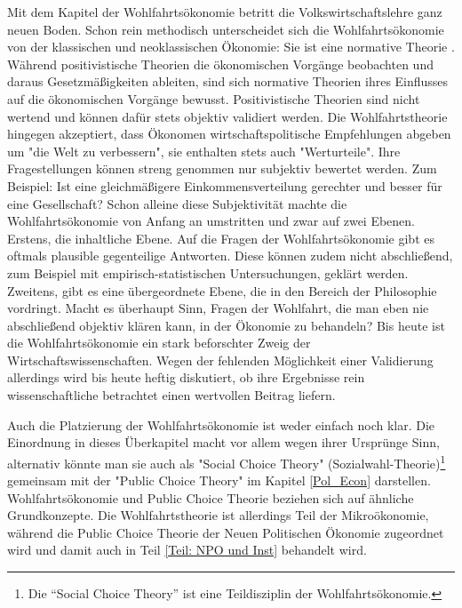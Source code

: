 Mit dem Kapitel der Wohlfahrtsökonomie betritt die Volkswirtschaftslehre ganz neuen Boden. Schon rein methodisch unterscheidet sich die Wohlfahrtsökonomie von der klassischen und neoklassischen Ökonomie: Sie ist eine normative Theorie \parencite[S. 77]{Scitovsky1941}. Während positivistische Theorien die ökonomischen Vorgänge beobachten und daraus Gesetzmäßigkeiten ableiten, sind sich normative Theorien ihres Einflusses auf die ökonomischen Vorgänge bewusst. Positivistische Theorien sind nicht wertend und können dafür stets objektiv validiert werden. Die Wohlfahrtstheorie hingegen akzeptiert, dass Ökonomen wirtschaftspolitische Empfehlungen abgeben um "die Welt zu verbessern", sie enthalten stets auch "Werturteile". Ihre Fragestellungen können streng genommen nur subjektiv bewertet werden. Zum Beispiel: Ist eine gleichmäßigere Einkommensverteilung gerechter und besser für eine Gesellschaft?  Schon alleine diese Subjektivität machte die Wohlfahrtsökonomie von Anfang an umstritten und zwar auf zwei Ebenen. Erstens, die inhaltliche Ebene. Auf die Fragen der Wohlfahrtsökonomie gibt es oftmals plausible gegenteilige Antworten. Diese können zudem nicht abschließend, zum Beispiel mit empirisch-statistischen Untersuchungen, geklärt werden. Zweitens, gibt es eine übergeordnete Ebene, die in den Bereich der Philosophie vordringt. Macht es überhaupt Sinn, Fragen der Wohlfahrt, die man eben nie abschließend objektiv klären kann, in der Ökonomie zu behandeln? Bis heute ist die Wohlfahrtsökonomie ein stark beforschter Zweig der Wirtschaftswissenschaften. Wegen der fehlenden Möglichkeit einer Validierung allerdings wird bis heute heftig diskutiert, ob ihre Ergebnisse rein wissenschaftliche betrachtet einen wertvollen Beitrag liefern. 

Auch die Platzierung der Wohlfahrtsökonomie ist weder einfach noch klar. Die Einordnung in dieses Überkapitel macht vor allem wegen ihrer Ursprünge Sinn, alternativ könnte man sie auch als "Social Choice Theory" (Sozialwahl-Theorie)\footnote{Die "`Social Choice Theory"' ist eine Teildisziplin der Wohlfahrtsökonomie.} gemeinsam mit der "Public Choice Theory" im Kapitel \ref{Pol_Econ} darstellen. Wohlfahrtsökonomie und Public Choice Theorie beziehen sich auf ähnliche Grundkonzepte. Die Wohlfahrtstheorie ist allerdings Teil der Mikroökonomie, während die Public Choice Theorie der Neuen Politischen Ökonomie zugeordnet wird und damit auch in Teil \ref{Teil: NPO und Inst} behandelt wird. 

